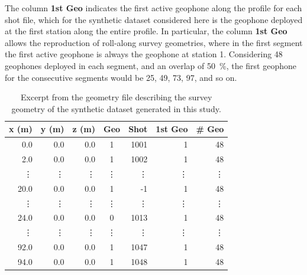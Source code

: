 \documentclass[a4paper,fleqn]{cas-sc}
\begin{document}
The column \textbf{1st Geo} indicates the first active geophone along the profile for each shot file, which for the synthetic dataset considered here is the geophone deployed at the first station along the entire profile. In particular, the column \textbf{1st Geo} allows the reproduction of roll-along survey geometries, where in the first segment the first active geophone is always the geophone at station 1. Considering 48 geophones deployed in each segment, and an overlap of \qty{50}{\%}, the first geophone for the consecutive segments would be 25, 49, 73, 97, and so on. 
\begin{table}
   \caption{Excerpt from the geometry file describing the survey geometry of the synthetic dataset generated in this study.}
    \centering
    \begin{tabular}{rrrcrrr}
        \toprule
        \textbf{x (m)} & \textbf{y (m)} & \textbf{z (m)} & \textbf{Geo} & \textbf{Shot} & \textbf{1st Geo} & \textbf{\# Geo} \\
        \midrule
		0.0 & 0.0 & 0.0 & 1 & 1001 & 1 & 48 \\
		2.0 & 0.0 & 0.0 & 1 & 1002 & 1 & 48 \\
        \vdots & \vdots & \vdots & \vdots & \vdots & \vdots & \vdots \\
		20.0 & 0.0 & 0.0 & 1 & -1 & 1 & 48 \\
        \vdots & \vdots & \vdots & \vdots & \vdots & \vdots & \vdots \\
        24.0 & 0.0 & 0.0 & 0 & 1013 & 1 & 48 \\
        \vdots & \vdots & \vdots & \vdots & \vdots & \vdots & \vdots \\
		92.0 & 0.0 & 0.0 & 1 & 1047 & 1 & 48 \\
		94.0 & 0.0 & 0.0 & 1 & 1048 & 1 & 48 \\
        \bottomrule
    \end{tabular}
    \label{tab:syn_geometry}
\end{table}
\end{document}
